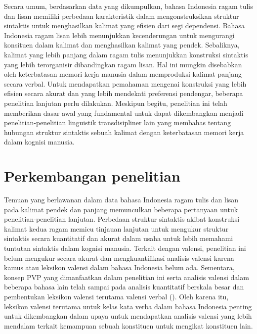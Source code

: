 Secara umum, berdasarkan data yang dikumpulkan, bahasa Indonesia ragam tulis dan lisan memiliki perbedaan karakteristik dalam mengonstruksikan struktur sintaktis untuk menghasilkan kalimat yang efisien dari segi dependensi. Bahasa Indonesia ragam lisan lebih menunjukkan kecenderungan untuk mengurangi konsituen dalam kalimat dan menghasilkan kalimat yang pendek. Sebaliknya, kalimat yang lebih panjang dalam ragam tulis menunjukkan konstruksi sintaktis yang lebih terorganisir dibandingkan ragam lisan. Hal ini mungkin disebabkan oleh keterbatasan memori kerja manusia dalam memproduksi kalimat panjang secara verbal. Untuk mendapatkan pemahaman mengenai konstruksi yang lebih efisien secara akurat dan yang lebih mendekati preferensi pendengar, beberapa penelitian lanjutan perlu dilakukan. Meskipun begitu, penelitian ini telah memberikan dasar awal yang fundamental untuk dapat dikembangkan menjadi penelitian-penelitian linguistik transdisipliner lain yang membahas tentang hubungan struktur sintaktis sebuah kalimat dengan keterbatasan memori kerja dalam kognisi manusia.

\section{Perkembangan penelitian}

Temuan yang berlawanan dalam data bahasa Indonesia ragam tulis dan lisan pada kalimat pendek dan panjang memunculkan beberapa pertanyaan untuk penelitian-penelitian lanjutan. Perbedaan struktur sintaktis akibat konstruksi kalimat kedua ragam memicu tinjauan lanjutan untuk mengukur struktur sintaktis secara kuantitatif dan akurat dalam usaha untuk lebih memahami tuntutan sintaktis dalam kognisi manusia. Terkait dengan valensi, penelitian ini belum mengukur secara akurat dan mengkuantifikasi analisis valensi karena kamus atau leksikon valensi dalam bahasa Indonesia belum ada. Sementara, konsep PVP \citep{liu2006syntactic} yang dimanfaatkan dalam penelitian ini serta analisis valensi dalam beberapa bahasa lain telah sampai pada analisis kuantitatif berskala besar dan pembentukan leksikon valensi terutama valensi verbal (\citealp{zabokrtsky2005valency, bielicky2008building, passarotti2016latin, semecky2006constructing}). Oleh karena itu, leksikon valensi terutama untuk kelas kata verba dalam bahasa Indonesia penting untuk dikembangkan dalam upaya untuk mendapatkan analisis valensi yang lebih mendalam terkait kemampuan sebuah konstituen untuk mengikat konstituen lain. 

